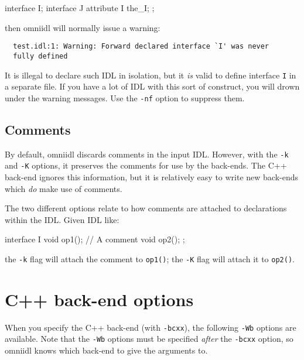 \documentclass[11pt,twoside,a4paper]{book}
\newcommand{\intf}[1]{\texttt{#1}}
\newcommand{\op}[1]{\texttt{#1()}}
\newcommand{\cmdline}[1]{\texttt{#1}}
\begin{document}
\begin{idllisting}
interface I;
interface J {
  attribute I the_I;
};
\end{idllisting}

\noindent then omniidl will normally issue a warning:

{\small
\begin{verbatim}
  test.idl:1: Warning: Forward declared interface `I' was never
  fully defined
\end{verbatim}
}

\noindent It is illegal to declare such IDL in isolation, but it
\emph{is} valid to define interface \intf{I} in a separate file. If
you have a lot of IDL with this sort of construct, you will drown
under the warning messages. Use the \cmdline{-nf} option to suppress
them.


\subsection{Comments}

By default, omniidl discards comments in the input IDL. However, with
the \cmdline{-k} and \cmdline{-K} options, it preserves the comments
for use by the back-ends. The C++ back-end ignores this information,
but it is relatively easy to write new back-ends which \emph{do} make
use of comments.

The two different options relate to how comments are attached to
declarations within the IDL. Given IDL like:

\begin{idllisting}
interface I {
  void op1();
  // A comment
  void op2();
};
\end{idllisting}

\noindent the \cmdline{-k} flag will attach the comment to \op{op1};
the \cmdline{-K} flag will attach it to \op{op2}.



\section{C++ back-end options}
\label{sec:cxx_backend}

When you specify the C++ back-end (with \cmdline{-bcxx}), the
following \cmdline{-Wb} options are available. Note that the
\cmdline{-Wb} options must be specified \emph{after} the
\cmdline{-bcxx} option, so omniidl knows which back-end to give the
arguments to.
\end{document}
